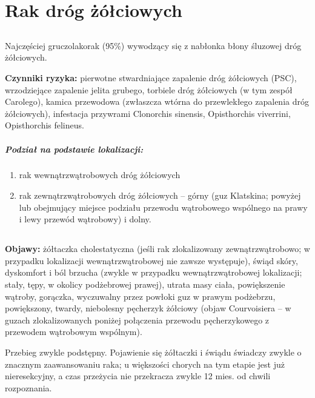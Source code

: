 
\chapter{Rak dróg żółciowych}

\section{\DiEtp}

Najczęściej gruczolakorak (95\%) wywodzący się z nabłonka błony śluzowej dróg żółciowych. 

\textbf{Czynniki ryzyka:} pierwotne stwardniające zapalenie dróg żółciowych (PSC), wrzodziejące zapalenie jelita grubego, torbiele dróg żółciowych (w tym zespół Carolego), kamica przewodowa (zwłaszcza wtórna do przewlekłego zapalenia dróg żółciowych), infestacja przywrami Clonorchis sinensis, Opisthorchis viverrini, Opisthorchis felineus. 

\paragraph{Podział na podstawie lokalizacji:}

\begin{enumerate}
    \item rak wewnątrzwątrobowych dróg żółciowych

    \item rak zewnątrzwątrobowych dróg żółciowych – górny (guz Klatskina; powyżej lub obejmujący miejsce podziału przewodu wątrobowego wspólnego na prawy i lewy przewód wątrobowy) i dolny.
\end{enumerate}

\section{\ObriP}

\textbf{Objawy:} żółtaczka cholestatyczna (jeśli rak zlokalizowany zewnątrzwątrobowo; w przypadku lokalizacji wewnątrzwątrobowej nie zawsze występuje), świąd skóry, dyskomfort i ból brzucha (zwykle w przypadku wewnątrzwątrobowej lokalizacji; stały, tępy, w okolicy podżebrowej prawej), utrata masy ciała, powiększenie wątroby, gorączka, wyczuwalny przez powłoki guz w prawym podżebrzu, powiększony, twardy, niebolesny pęcherzyk żółciowy (objaw Courvoisiera – w guzach zlokalizowanych poniżej połączenia przewodu pęcherzykowego z przewodem wątrobowym wspólnym).

Przebieg zwykle podstępny. 
Pojawienie się żółtaczki i świądu świadczy zwykle o znacznym zaawansowaniu raka; u większości chorych na tym etapie jest już nieresekcyjny, a czas przeżycia nie przekracza zwykle 12 mies. od chwili rozpoznania.

